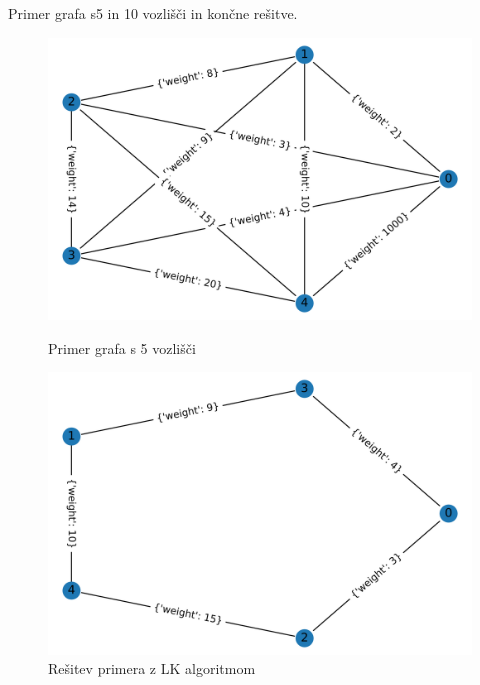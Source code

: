 \documentclass[12pt, a4paper]{article}
\begin{document}
Primer grafa s5 in 10 vozlišči in končne rešitve.

\begin{figure}[!h]
    
    \begin{minipage}{0.5\textwidth}
    \includegraphics[width=7 cm]{primeri/primer1.png}
    \caption{Primer grafa s 5 vozlišči}
    \label{primer_LK}
  \end{minipage}
 \hspace{1cm}
  \begin{minipage}{0.5\textwidth}
    \includegraphics[width=7 cm]{primeri/primer1_lk.png}
    \caption{Rešitev primera z LK algoritmom}
    \label{resitev_LK}
  \end{minipage}
    
\end{figure}
\end{document}
